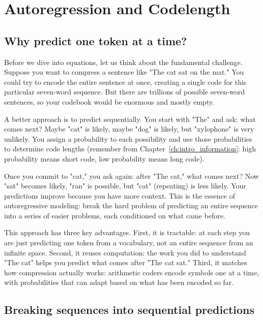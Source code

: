 \section{Autoregression and Codelength}
\label{sec:autoregression}

\subsection{Why predict one token at a time?}
\label{sec:why_autoregressive}

Before we dive into equations, let us think about the fundamental challenge. Suppose you want to compress a sentence like "The cat sat on the mat." You could try to encode the entire sentence at once, creating a single code for this particular seven-word sequence. But there are trillions of possible seven-word sentences, so your codebook would be enormous and mostly empty.

A better approach is to predict sequentially. You start with "The" and ask: what comes next? Maybe "cat" is likely, maybe "dog" is likely, but "xylophone" is very unlikely. You assign a probability to each possibility and use those probabilities to determine code lengths (remember from Chapter~\ref{ch:intro_information}: high probability means short code, low probability means long code).

Once you commit to "cat," you ask again: after "The cat," what comes next? Now "sat" becomes likely, "ran" is possible, but "cat" (repeating) is less likely. Your predictions improve because you have more context. This is the essence of autoregressive modeling: break the hard problem of predicting an entire sequence into a series of easier problems, each conditioned on what came before.

This approach has three key advantages. First, it is tractable: at each step you are just predicting one token from a vocabulary, not an entire sequence from an infinite space. Second, it reuses computation: the work you did to understand "The cat" helps you predict what comes after "The cat sat." Third, it matches how compression actually works: arithmetic coders encode symbols one at a time, with probabilities that can adapt based on what has been encoded so far.

\subsection{Breaking sequences into sequential predictions}
\label{sec:chainrule}


